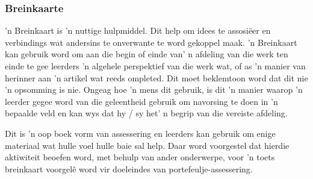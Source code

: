 \subsubsection{Breinkaarte}
'n Breinkaart is 'n nuttige hulpmiddel. Dit help om idees te
assosi\"{e}er en verbindings wat andersins te onverwante te word
gekoppel maak. 'n Breinkaart kan gebruik word om aan die begin of
einde van' n afdeling van die werk ten einde te gee leerders 'n
algehele perspektief van die werk wat, of as 'n manier van herinner
aan 'n artikel wat reeds ompleted. Dit moet beklemtoon word dat dit
nie 'n opsomming is nie. Ongeag hoe 'n mens dit gebruik, is dit 'n
manier waarop 'n leerder gegee word van die geleentheid gebruik om
navorsing te doen in 'n bepaalde veld en kan wys dat hy / sy het' n
begrip van die vereiste afdeling.

Dit is 'n oop boek vorm van assessering en leerders kan gebruik om
enige materiaal wat hulle voel hulle baie sal help. Daar word
voorgestel dat hierdie aktiwiteit beoefen word, met behulp van ander
onderwerpe, voor 'n toets breinkaart voorgelê word vir doeleindes van
portefeulje-assessering.


